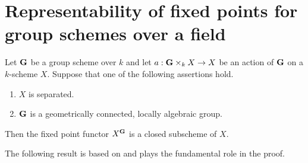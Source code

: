 \section{Representability of fixed points for group schemes over a field}

\begin{theorem}\label{theorem:fixed_points_existence}
Let $\mathbf{G}$ be a group scheme over $k$ and let $a:\mathbf{G}\times_kX\rightarrow X$ be an action of $\mathbf{G}$ on a $k$-scheme $X$. Suppose that one of the following assertions hold.
\begin{enumerate}[label=\emph{\textbf{(\roman*)}}, leftmargin=3.0em]
\item $X$ is separated.
\item $\mathbf{G}$ is a geometrically connected, locally algebraic group.
\end{enumerate}
Then the fixed point functor $X^{\mathbf{G}}$ is a closed subscheme of $X$.
\end{theorem}
\noindent
The following result is based on {\cite[Theorem 8.2]{kfunctors}} and plays the fundamental role in the proof.

